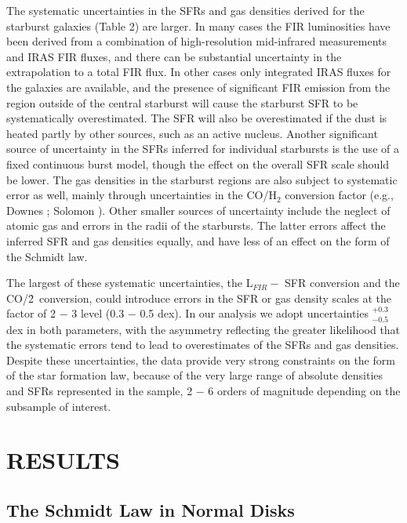 The systematic uncertainties in the SFRs and gas densities derived for 
the starburst galaxies (Table 2) are larger.  In many cases the FIR 
luminosities have been derived from a combination of high-resolution
mid-infrared measurements and IRAS FIR fluxes, and there can be substantial
uncertainty in the extrapolation to a total FIR flux.  In other cases
only integrated IRAS fluxes for the galaxies are available, and the 
presence of significant FIR emission from the region outside of the
central starburst will cause the starburst SFR to be systematically
overestimated.  The SFR will also be overestimated 
if the dust is heated partly by other sources, such as an active nucleus.
Another significant source of uncertainty in the SFRs inferred for 
individual starbursts is the use of a fixed continuous burst model,
though the effect on the overall SFR scale should be lower.
The gas densities in the starburst regions are also subject to 
systematic error as well, mainly through uncertainties in the CO/H$_2$ 
conversion factor (e.g., Downes ; 
Solomon ).  Other smaller sources of uncertainty include the
neglect of atomic gas and errors in the radii of the starbursts.  The 
latter errors affect the inferred SFR and gas densities equally, and 
have less of an effect on the form of the Schmidt law.

The largest of these systematic uncertainties, the L$_{FIR} -$ SFR conversion
and the CO/\h2\ conversion, could introduce errors in the SFR or gas
density scales at the factor of 2 $-$ 3 level (0.3 $-$ 0.5 dex).  In our
analysis we adopt uncertainties 
${^{+0.3}_{-0.5}}$ dex in both parameters, with the asymmetry reflecting 
the greater likelihood that the systematic errors tend to lead to overestimates
of the SFRs and gas densities.  Despite these uncertainties,
the data provide very strong constraints on the form of the 
star formation law, because of the very large range of absolute densities and 
SFRs represented in the sample, 2 $-$ 6 orders of magnitude depending on the 
subsample of interest.  

\section{RESULTS}

\subsection{The Schmidt Law in Normal Disks}

